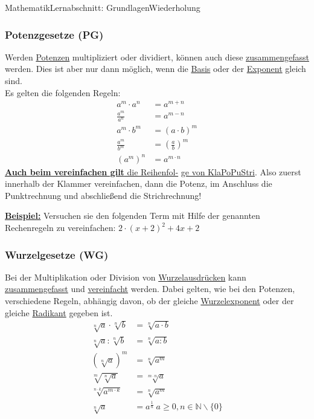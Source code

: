 \documentclass[11pt,twocolumn,oneside,openany,headings=optiontotoc,11pt,numbers=noenddot]{article}
\begin{document}
\begin{worksheet}{Mathematik}{Lernabschnitt: Grundlagen}{Wiederholung}
		\subsubsection*{Potenzgesetze (PG)}
		Werden \underline{Potenzen} multipliziert oder dividiert, können auch diese \underline{zusammengefasst} werden. Dies ist aber nur dann möglich, wenn die \underline{Basis} oder der \underline{Exponent} gleich sind.\\
		Es gelten die folgenden Regeln:
		\begin{align*}
			a^m\cdot{}a^n & = a ^{m+n}\\
			\frac{a^m}{a^n} & = a^{m-n}\\
			a^m\cdot{}b^m & = (a\cdot{}b)^m\\
			\frac{a^m}{b^m} & = \left(\frac{a}{b}\right)^m\\
			(a^m)^n & = a^{m\cdot{}n}
		\end{align*}
		\newpage
		\underline{\textbf{Auch beim vereinfachen gilt} die Reihenfol-} \underline{ge von \color{red}KlaPoPuStri\normalcolor}. Also zuerst innerhalb der Klammer vereinfachen, dann die Potenz, im Anschluss die Punktrechnung und abschließend die Strichrechnung!\\
		\par\bigskip\noindent
		\underline{\textbf{Beispiel:}} Versuchen sie den folgenden Term mit Hilfe der genannten Rechenregeln zu vereinfachen: \(2\cdot{}(x+2)^2 + 4x + 2\)
		\subsubsection*{Wurzelgesetze (WG)}
		Bei der Multiplikation oder Division von \underline{Wurzelausdrücken} kann \underline{zusammengefasst} und \underline{vereinfacht} werden. Dabei gelten, wie bei den Potenzen, verschiedene Regeln, abhängig davon, ob der gleiche \underline{Wurzelexponent} oder der gleiche \underline{Radikant} gegeben ist.
		\begin{align*}
			\sqrt[n]{a}\cdot\sqrt[n]{b} & = \sqrt[n]{a\cdot{}b}\\
			\sqrt[n]{a}:\sqrt[n]{b} & = \sqrt[n]{a:b}\\
			(\sqrt[n]{a})^m & = \sqrt[n]{a^m}\\
			\sqrt[m]{\sqrt[n]{a}} & = \sqrt[m\cdot{}n]{a}\\
			\sqrt[n\cdot{}k]{a^{m\cdot{}k}} & = \sqrt[n]{a^m}\\
			\sqrt[n]{a} & = a^{\frac{1}{n}}\ a\geq 0, n\in\mathbb{N}\backslash\{0\}
		\end{align*}

\end{worksheet}
\end{document}
